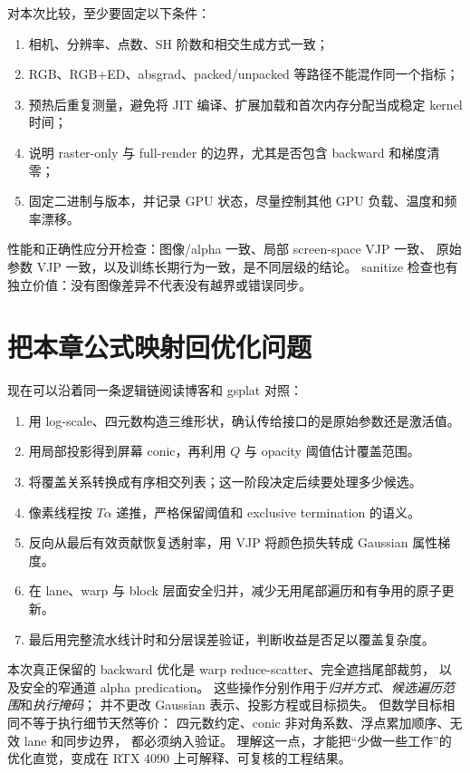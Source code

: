 对本次比较，至少要固定以下条件：
\begin{enumerate}
 \item 相机、分辨率、点数、SH 阶数和相交生成方式一致；
 \item RGB、RGB+ED、absgrad、packed/unpacked 等路径不能混作同一个指标；
 \item 预热后重复测量，避免将 JIT 编译、扩展加载和首次内存分配当成稳定 kernel 时间；
 \item 说明 raster-only 与 full-render 的边界，尤其是否包含 backward 和梯度清零；
 \item 固定二进制与版本，并记录 GPU 状态，尽量控制其他 GPU 负载、温度和频率漂移。
\end{enumerate}
性能和正确性应分开检查：图像/alpha 一致、局部 screen-space VJP 一致、
原始参数 VJP 一致，以及训练长期行为一致，是不同层级的结论。
sanitize 检查也有独立价值：没有图像差异不代表没有越界或错误同步。

\section{把本章公式映射回优化问题}

现在可以沿着同一条逻辑链阅读博客和 gsplat 对照：
\begin{enumerate}
 \item 用 log-scale、四元数构造三维形状，确认传给接口的是原始参数还是激活值。
 \item 用局部投影得到屏幕 conic，再利用 $Q$ 与 opacity 阈值估计覆盖范围。
 \item 将覆盖关系转换成有序相交列表；这一阶段决定后续要处理多少候选。
 \item 像素线程按 $T\alpha$ 递推，严格保留阈值和 exclusive termination 的语义。
 \item 反向从最后有效贡献恢复透射率，用 VJP 将颜色损失转成 Gaussian 属性梯度。
 \item 在 lane、warp 与 block 层面安全归并，减少无用尾部遍历和有争用的原子更新。
 \item 最后用完整流水线计时和分层误差验证，判断收益是否足以覆盖复杂度。
\end{enumerate}

本次真正保留的 backward 优化是 warp reduce-scatter、完全遮挡尾部裁剪，
以及安全的窄通道 alpha predication。
这些操作分别作用于\emph{归并方式}、\emph{候选遍历范围}和\emph{执行掩码}；
并不更改 Gaussian 表示、投影方程或目标损失。
但数学目标相同不等于执行细节天然等价：
四元数约定、conic 非对角系数、浮点累加顺序、无效 lane 和同步边界，
都必须纳入验证。
理解这一点，才能把“少做一些工作”的优化直觉，变成在 RTX 4090 上可解释、可复核的工程结果。
